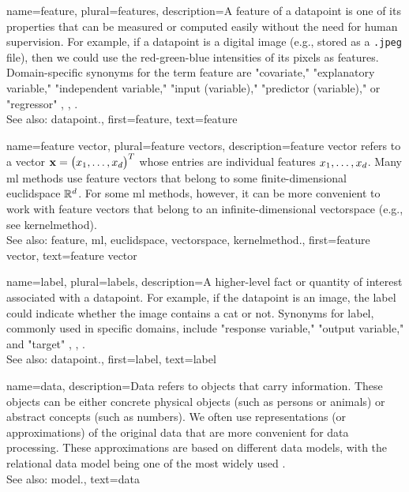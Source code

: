 {name={feature}, plural={features},
	description={A feature of a \gls{datapoint} is one of its properties that can be 
		measured or computed easily without the need for human supervision. For example, if a \gls{datapoint} 
		is a digital image (e.g., stored as a \texttt{.jpeg} file), then we could use the red-green-blue intensities 
		of its pixels as features. Domain-specific synonyms for the term feature are "covariate," "explanatory variable," 
		"independent variable," "input (variable)," "predictor (variable)," or "regressor" \cite{Gujarati2021}, \cite{Dodge2003}, \cite{Everitt2022}. 
				\\
		See also: \gls{datapoint}.}, 
	first={feature},
	text={feature}  
}

{name={feature vector}, plural={feature vectors},
	description={\Gls{feature} vector refers to a vector ${\bf x} = \big(x_{1},\ldots,x_{d}\big)^{T}$ 
		whose entries are individual \glspl{feature} $x_{1},\ldots,x_{d}$. Many \gls{ml} methods 
		use \gls{feature} vectors that belong to some finite-dimensional \gls{euclidspace} $\mathbb{R}^{d}$. 
		For some \gls{ml} methods, however, it can be more convenient to work with \gls{feature} 
		vectors that belong to an infinite-dimensional \gls{vectorspace} (e.g., see \gls{kernelmethod}). 
			\\
		See also: \gls{feature}, \gls{ml}, \gls{euclidspace}, \gls{vectorspace}, \gls{kernelmethod}.}, 
	first={feature vector},
	text={feature vector}  
}


{name={label}, plural={labels},
	description={A higher-level fact or quantity of interest associated with a \gls{datapoint}. 
		For example, if the \gls{datapoint} is an image, the label could indicate whether the 
		image contains a cat or not. Synonyms for label, commonly used in specific domains, 
		include "response variable," "output variable," and "target" \cite{Gujarati2021}, \cite{Dodge2003}, \cite{Everitt2022}.
				\\
		See also: \gls{datapoint}.},
	first={label},
	text={label}  
}


{name={data},
	 description={Data refers to objects that carry information. These 
	 	objects can be either concrete physical objects (such as persons or animals) 
	 	or abstract concepts (such as numbers). We often use representations (or 
	 	approximations) of the original data that are more convenient for data processing. 
	 	These approximations are based on different data \glspl{model}, with the relational data 
	 	\gls{model} being one of the most widely used \cite{codd1970relational}.
				\\
		See also: \gls{model}.}, 
	text={data}
}

